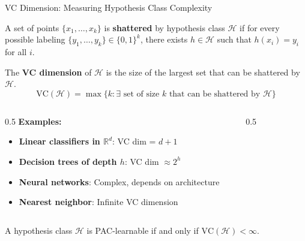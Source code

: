 \documentclass[aspectratio=169,11pt]{beamer}
\newcommand{\Real}{\mathbb{R}}
\begin{document}
\begin{frame}{VC Dimension: Measuring Hypothesis Class Complexity}
\begin{definition}[Shattering]
A set of points $\{x_1, \ldots, x_k\}$ is \textbf{shattered} by hypothesis class $\mathcal{H}$ if for every possible labeling $\{y_1, \ldots, y_k\} \in \{0,1\}^k$, there exists $h \in \mathcal{H}$ such that $h(x_i) = y_i$ for all $i$.
\end{definition}

\begin{definition}[VC Dimension]
The \textbf{VC dimension} of $\mathcal{H}$ is the size of the largest set that can be shattered by $\mathcal{H}$.
\[\text{VC}(\mathcal{H}) = \max\{k : \exists \text{ set of size } k \text{ that can be shattered by } \mathcal{H}\}\]
\end{definition}

\begin{columns}
\begin{column}{0.5\textwidth}
\textbf{Examples:}
\begin{itemize}
\item \textbf{Linear classifiers in $\Real^d$}: VC dim = $d + 1$
\item \textbf{Decision trees of depth $h$}: VC dim $\approx 2^h$
\item \textbf{Neural networks}: Complex, depends on architecture
\item \textbf{Nearest neighbor}: Infinite VC dimension
\end{itemize}
\end{column}
\begin{column}{0.5\textwidth}
\begin{figure}
\centering
{}
\end{figure}
\end{column}
\end{columns}

\begin{theorem}
A hypothesis class $\mathcal{H}$ is PAC-learnable if and only if $\text{VC}(\mathcal{H}) < \infty$.
\end{theorem}
\end{frame}
\end{document}
